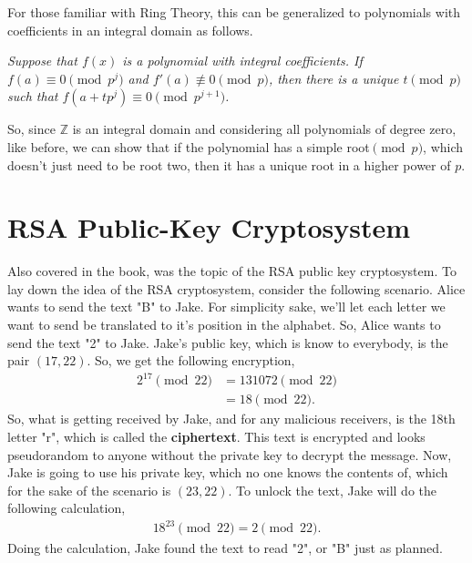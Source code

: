 \documentclass[12pt]{article}
\newenvironment{theorem}[2][Theorem]{\begin{trivlist}
\item[\hskip \labelsep {\bfseries #1}\hskip \labelsep {\bfseries #2}]}{\end{trivlist}}
\begin{document}
\vspace{1em}

For those familiar with Ring Theory, this can be generalized to polynomials with coefficients in an integral domain as follows.

\begin{theorem}{7.27 (Hensel's Lemma)} \textit{Suppose that $f(x)$ is a polynomial with integral coefficients. If $f(a) \equiv 0 \pmod{p^j}$ and $f'(a) \not\equiv 0 \pmod{p}$, then there is a unique $t \pmod{p}$ such that $f(a+tp^j) \equiv 0 \pmod{p^{j+1}}$.} \cite[pg.87]{niven1991introduction}
\end{theorem}

\vspace{1em}

So, since $\mathbb{Z}$ is an integral domain and considering all polynomials of degree zero, like before, we can show that if the polynomial has a simple root$\pmod{p}$, which doesn't just need to be root two, then it has a unique root in a higher power of $p$.

\section{RSA Public-Key Cryptosystem}

\hspace{1em} Also covered in the book, was the topic of the RSA public key cryptosystem. To lay down the idea of the RSA cryptosystem, consider the following scenario. Alice wants to send the text "B" to Jake. For simplicity sake, we'll let each letter we want to send be translated to it's position in the alphabet. So, Alice wants to send the text "2" to Jake. Jake's public key, which is know to everybody, is the pair $(17,22)$. So, we get the following encryption, \begin{align*}
    2^{17} \pmod{22} &= 131072 \pmod{22} \tag*{(Note "2" is the text we are encrypting)} \\ &= 18 \pmod{22}.
\end{align*}
So, what is getting received by Jake, and for any malicious receivers, is the 18th letter "r", which is called the \textbf{ciphertext}. This text is encrypted and looks pseudorandom to anyone without the private key to decrypt the message. Now, Jake is going to use his private key, which no one knows the contents of, which for the sake of the scenario is $(23,22)$. To unlock the text, Jake will do the following calculation, \begin{align*}
    18^{23} \pmod{22} = 2 \pmod{22}.
\end{align*}
Doing the calculation, Jake found the text to read "2", or "B" just as planned.
\end{document}

